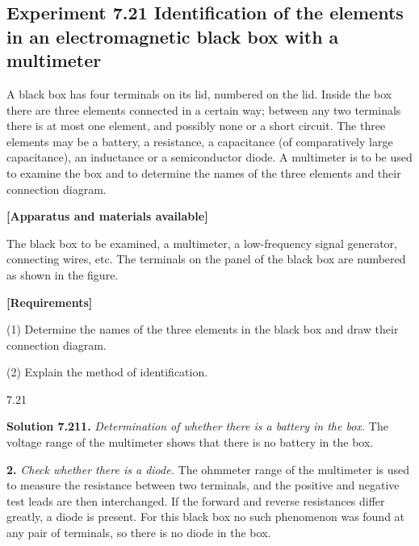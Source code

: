 \subsection*{Experiment 7.21 \quad Identification of the elements in an electromagnetic black box with a multimeter}

A black box has four terminals on its lid, numbered on the lid. Inside the box there are three elements connected in a certain way; between any two terminals there is at most one element, and possibly none or a short circuit. The three elements may be a battery, a resistance, a capacitance (of comparatively large capacitance), an inductance or a semiconductor diode. A multimeter is to be used to examine the box and to determine the names of the three elements and their connection diagram.

\textbf{[Apparatus and materials available]}

The black box to be examined, a multimeter, a low-frequency signal generator, connecting wires, etc. The terminals on the panel of the black box are numbered as shown in the figure.

\textbf{[Requirements]}

(1) Determine the names of the three elements in the black box and draw their connection diagram.

(2) Explain the method of identification.

\begin{figbox}{7.21}
\end{figbox}

\textbf{Solution 7.21}\quad \textbf{1.} \emph{Determination of whether there is a battery in the box.} The voltage range of the multimeter shows that there is no battery in the box.

\textbf{2.} \emph{Check whether there is a diode.} The ohmmeter range of the multimeter is used to measure the resistance between two terminals, and the positive and negative test leads are then interchanged. If the forward and reverse resistances differ greatly, a diode is present. For this black box no such phenomenon was found at any pair of terminals, so there is no diode in the box.

